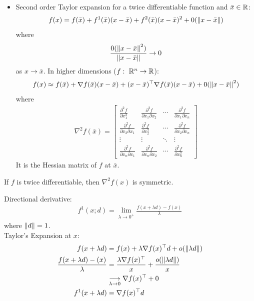 \documentclass[11pt]{article}
\numberwithin{equation}{section}
\begin{document}
\begin{itemize}
    \item Second order Taylor expansion for a twice differentiable function and $\bar{x} \in \mathbb R$:\begin{align*}
        f(x) = f(\bar{x}) + f^1 (\bar{x})(x-\bar{x}) + f^2 (\bar{x})(x-\bar{x})^2 + 0(\left\| x-\bar{x} \right\|)
    \end{align*} where \begin{align*}
        \frac{0(\left\| x-\bar{x} \right\|^2)}{\left\| x-\bar{x} \right\|}  \rightarrow 0
    \end{align*} as $x \rightarrow \bar{x}$. In higher dimensions ($f: \ \mathbb R^n \rightarrow \mathbb R$): \begin{align*}
        f(x) \approx f(\bar{x}) + \nabla f(\bar{x})(x-\bar{x}) + (x-\bar{x})^\top \nabla f(\bar{x})(x-\bar{x}) + 0(\left\| x-\bar{x} \right\|^2)
    \end{align*} where \begin{align*}
        \nabla ^2 f(\bar{x}) = \left[\begin{array}{cccc}
            \frac{\partial^{2} f}{\partial x_{1}^{2}} & \frac{\partial^{2} f}{\partial x_{1} \partial x_{2}} & \cdots & \frac{\partial^{2} f}{\partial x_{1} \partial x_{n}} \\
            \frac{\partial^{2} f}{\partial x_{2} \partial x_{1}} & \frac{\partial^{2} f}{\partial x_{2}^{2}} & \cdots & \frac{\partial^{2} f}{\partial x_{2} \partial x_{n}} \\
            \vdots & \vdots & \ddots & \vdots \\
            \frac{\partial^{2} f}{\partial x_{n} \partial x_{1}} & \frac{\partial^{2} f}{\partial x_{n} \partial x_{2}} & \cdots & \frac{\partial^{2} f}{\partial x_{n}^{2}}
            \end{array}\right]
    \end{align*}
    It is the Hessian matrix of $f$ at $\bar{x}$.
\end{itemize}

\begin{theorem}
    If $f$ is twice differentiable, then $\nabla^2 f(x)$ is symmetric.
\end{theorem}

Directional derivative: \begin{align*}
    f^1 (x;d) = \lim_{\lambda \rightarrow 0^+} \frac{f(x + \lambda d ) - f(x)}{\lambda}
\end{align*} where $\left\| d \right\|=1$.\\
Taylor's Expansion at $x$: \begin{align*}
    f(x+\lambda d) &=f(x)+\lambda \nabla f(x)^{\top} d+ o(\left\| \lambda d \right\|) \\
    \frac{f(x+\lambda d)-(x)}{\lambda} &= \frac{\lambda \nabla f(x)^{\top}}{x} + \frac{o(\left\| \lambda d \right\|)}{x} \\
    &\underset{\lambda \rightarrow 0}{\longrightarrow} \nabla f(x)^{\top} + 0 \\
    f^1(x+\lambda d) &= \nabla f(x)^{\top} d
\end{align*}
\end{document}
